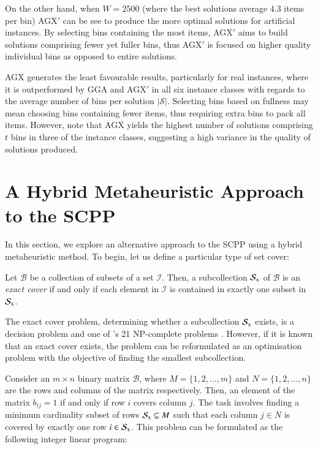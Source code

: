 \documentclass[authoryear]{elsarticle}
\begin{document}
On the other hand, when $W = 2500$ (where the best solutions average 4.3 items per bin) AGX$'$ can be see to produce the more optimal solutions for artificial instances. By selecting bins containing the most items, AGX$'$ aims to build solutions comprising fewer yet fuller bins, thus AGX$'$ is focused on higher quality individual bins as opposed to entire solutions.

AGX generates the least favourable results, particularly for real instances, where it is outperformed by GGA and AGX$'$ in all six instance classes with regards to the average number of bins per solution $|\mathcal{S}|$. Selecting bins based on fullness may mean choosing bins containing fewer items, thus requiring extra bins to pack all items. However, note that AGX yields the highest number of solutions comprising $t$ bins in three of the instance classes, suggesting a high variance in the quality of solutions produced.

\section{A Hybrid Metaheuristic Approach to the SCPP}
\label{sec:cmsa}
\noindent In this section, we explore an alternative approach to the SCPP using a hybrid metaheuristic method. To begin, let us define a particular type of set cover:

\begin{definition}
	\label{defn:exactcover}
	Let $\mathcal{B}$ be a collection of subsets of a set $\mathcal{I}$. Then, a subcollection $\mathcal{S}_{\textup{x}}$ of $\mathcal{B}$ is an \emph{exact cover} if and only if each element in $\mathcal{I}$ is contained in exactly one subset in $\mathcal{S}_{\textup{x}}$.
\end{definition}	

\noindent The exact cover problem, determining whether a subcollection $\mathcal{S}_{\textup{x}}$ exists, is a decision problem and one of \citeauthor{karp1972}'s 21 NP-complete problems \citeyearpar{karp1972}. However, if it is known that an exact cover exists, the problem can be reformulated as an optimisation problem with the objective of finding the smallest subcollection.

Consider an $m\times n$ binary matrix $\mathcal{B}$, where $M = \{1,2,\dotsc,m\}$ and $N = \{1,2,\dotsc,n\}$ are the rows and columns of the matrix respectively. Then, an element of the matrix $b_{ij} = 1$ if and only if row $i$ covers column $j$. The task involves finding a minimum cardinality subset of rows $\mathcal{S}_{\textup{x}} \subseteq M$ such that each column $j \in N$ is covered by exactly one row $i \in \mathcal{S}_{\textup{x}}$. This problem can be formulated as the following integer linear program:
\end{document}
